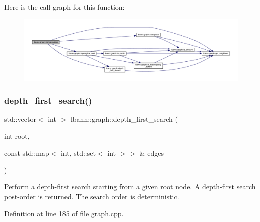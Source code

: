 Here is the call graph for this function\+:\nopagebreak
\begin{figure}[H]
\begin{center}
\leavevmode
\includegraphics[width=350pt]{namespacelbann_1_1graph_ae06c3de1931d3786348995d870b792ca_cgraph}
\end{center}
\end{figure}
\mbox{\label{namespacelbann_1_1graph_a44394207f3566604f867382b10aaf974}} 
\subsubsection{\texorpdfstring{depth\+\_\+first\+\_\+search()}{depth\_first\_search()}}
{\footnotesize\ttfamily std\+::vector$<$ int $>$ lbann\+::graph\+::depth\+\_\+first\+\_\+search (\begin{DoxyParamCaption}\item[{int}]{root,  }\item[{const std\+::map$<$ int, std\+::set$<$ int $>$$>$ \&}]{edges }\end{DoxyParamCaption})}

Perform a depth-\/first search starting from a given root node. A depth-\/first search post-\/order is returned. The search order is deterministic. 

Definition at line 185 of file graph.\+cpp.


